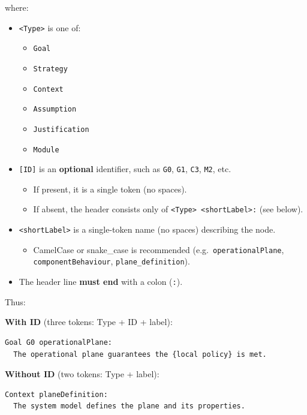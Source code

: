 \documentclass[11pt]{article}
\begin{document}
where:
\begin{itemize}[leftmargin=2em]
  \item \texttt{\textless Type\textgreater{}} is one of:
  \begin{itemize}[leftmargin=1.5em]
    \item \texttt{Goal}
    \item \texttt{Strategy}
    \item \texttt{Context}
    \item \texttt{Assumption}
    \item \texttt{Justification}
    \item \texttt{Module}
  \end{itemize}

  \item \texttt{[ID]} is an \textbf{optional} identifier, such as \texttt{G0}, \texttt{G1}, \texttt{C3}, \texttt{M2}, etc.
  \begin{itemize}[leftmargin=1.5em]
    \item If present, it is a single token (no spaces).
    \item If absent, the header consists only of \texttt{\textless Type\textgreater{} \textless shortLabel\textgreater:} (see below).
  \end{itemize}

  \item \texttt{\textless shortLabel\textgreater{}} is a single-token name (no spaces) describing the node.
  \begin{itemize}[leftmargin=1.5em]
    \item CamelCase or snake\_case is recommended (e.g.\ \texttt{operationalPlane}, \texttt{componentBehaviour}, \texttt{plane\_definition}).
  \end{itemize}

  \item The header line \textbf{must end} with a colon (\texttt{:}).
\end{itemize}

Thus:

\textbf{With ID} (three tokens: Type + ID + label):
\begin{verbatim}
Goal G0 operationalPlane:
  The operational plane guarantees the {local policy} is met.
\end{verbatim}

\textbf{Without ID} (two tokens: Type + label):
\begin{verbatim}
Context planeDefinition:
  The system model defines the plane and its properties.
\end{verbatim}
\end{document}
